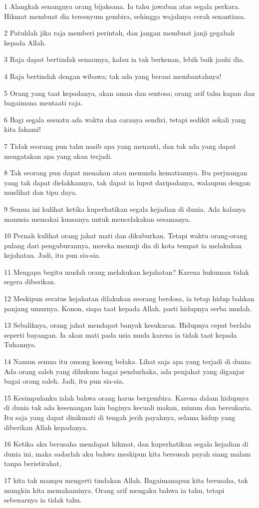 \par 1 Alangkah senangnya orang bijaksana. Ia tahu jawaban atas segala perkara. Hikmat membuat dia tersenyum gembira, sehingga wajahnya cerah senantiasa.
\par 2 Patuhlah jika raja memberi perintah, dan jangan membuat janji gegabah kepada Allah.
\par 3 Raja dapat bertindak semaunya, kalau ia tak berkenan, lebih baik jauhi dia.
\par 4 Raja bertindak dengan wibawa; tak ada yang berani membantahnya!
\par 5 Orang yang taat kepadanya, akan aman dan sentosa; orang arif tahu kapan dan bagaimana mentaati raja.
\par 6 Bagi segala sesuatu ada waktu dan caranya sendiri, tetapi sedikit sekali yang kita fahami!
\par 7 Tidak seorang pun tahu nasib apa yang menanti, dan tak ada yang dapat mengatakan apa yang akan terjadi.
\par 8 Tak seorang pun dapat menahan atau menunda kematiannya. Itu perjuangan yang tak dapat dielakkannya, tak dapat ia luput daripadanya, walaupun dengan muslihat dan tipu daya.
\par 9 Semua ini kulihat ketika kuperhatikan segala kejadian di dunia. Ada kalanya manusia memakai kuasanya untuk mencelakakan sesamanya.
\par 10 Pernah kulihat orang jahat mati dan dikuburkan. Tetapi waktu orang-orang pulang dari penguburannya, mereka memuji dia di kota tempat ia melakukan kejahatan. Jadi, itu pun sia-sia.
\par 11 Mengapa begitu mudah orang melakukan kejahatan? Karena hukuman tidak segera diberikan.
\par 12 Meskipun seratus kejahatan dilakukan seorang berdosa, ia tetap hidup bahkan panjang umurnya. Konon, siapa taat kepada Allah, pasti hidupnya serba mudah.
\par 13 Sebaliknya, orang jahat mendapat banyak kesukaran. Hidupnya cepat berlalu seperti bayangan. Ia akan mati pada usia muda karena ia tidak taat kepada Tuhannya.
\par 14 Namun semua itu omong kosong belaka. Lihat saja apa yang terjadi di dunia: Ada orang saleh yang dihukum bagai pendurhaka, ada penjahat yang diganjar bagai orang saleh. Jadi, itu pun sia-sia.
\par 15 Kesimpulanku ialah bahwa orang harus bergembira. Karena dalam hidupnya di dunia tak ada kesenangan lain baginya kecuali makan, minum dan bersukaria. Itu saja yang dapat dinikmati di tengah jerih payahnya, selama hidup yang diberikan Allah kepadanya.
\par 16 Ketika aku berusaha mendapat hikmat, dan kuperhatikan segala kejadian di dunia ini, maka sadarlah aku bahwa meskipun kita bersusah payah siang malam tanpa beristirahat,
\par 17 kita tak mampu mengerti tindakan Allah. Bagaimanapun kita berusaha, tak mungkin kita memahaminya. Orang arif mengaku bahwa ia tahu, tetapi sebenarnya ia tidak tahu.

